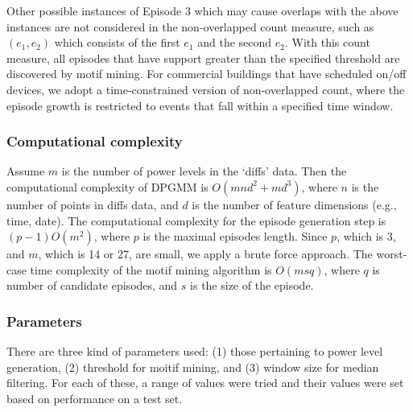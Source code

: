 Other possible instances of Episode 3 which may cause overlaps with the above
instances are not considered in the non-overlapped count measure,
such as \begin{math} (e_1, e_2) \end{math}
which consists of the first \begin{math}e_1 \end{math} and the
second \begin{math}e_2\end{math}. With this count measure, all episodes
that have support greater than the specified threshold are discovered
by motif mining.
For commercial buildings that have scheduled on/off devices, we
adopt a time-constrained version of non-overlapped count, where the episode
growth is restricted to events that fall within a specified time window.


\subsubsection*{Computational complexity} Assume $m$ is
the number of power levels in the `diffs' data. Then the computational complexity of
DPGMM is $O(mnd^2+md^3)$, where $n$ is the number of points in diffs data,
and $d$ is the number of feature dimensions (e.g.,  time, date).
The computational complexity
for the episode generation step is $(p-1)O(m^2)$, where $p$ is the
maximal
episodes length. Since $p$, which is 3, and $m$, which is 14 or 27, are small,
we apply a brute force approach. The worst-case time complexity of the motif
mining algorithm is $O(msq)$, where $q$ is number of candidate episodes, and
$s$ is the size of the episode.

\subsubsection*{Parameters} There are three kind of parameters used:
(1) those pertaining to power level generation, (2) threshold for moitif
mining, and (3) window size for median filtering. For each of these, a range
of values were tried and their values were set based on performance on a test
set.

